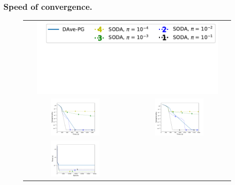 \subsubsection{Speed of convergence.} 
\begin{figure}[b!]
\begin{tabular}{cc}
\multicolumn{2}{c}{\vspace{-4pt}\includegraphics[width = 0.9\textwidth]{SODA/Figs/legend.pdf}}\vspace*{-100pt}\\
\includegraphics[width = 0.5\textwidth]{SODA/Figs/real-sim_20w_00001_0001_fun_vs_time_log.pdf} & 
\includegraphics[width = 0.5\textwidth]{SODA/Figs/rcv_20w_00001_0001_fun_vs_time_log.pdf}\\
\includegraphics[width = 0.5\textwidth]{SODA/Figs/real-sim_20w_00001_0001_time_vs_ite.pdf} & 

\end{tabular}
\end{figure}
